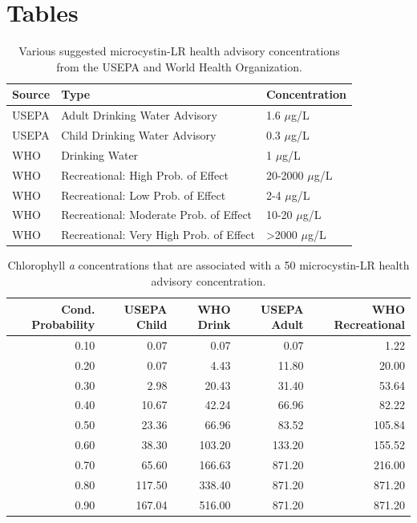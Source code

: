\documentclass[10pt,a4paper,twocolumn]{article}
\begin{document}
\onecolumn

\section{Tables}\label{tables}

\begin{table}[ht]
\caption{Various suggested microcystin-LR health advisory 
                     concentrations from the USEPA and World Health Organization.} 
\label{tab:microcystin_levels}
\begin{tabular}{lll}
  \hline
Source & Type & Concentration \\ 
  \hline
USEPA & Adult Drinking Water Advisory & 1.6 $\mu$g/L \\ 
  USEPA & Child Drinking Water Advisory & 0.3 $\mu$g/L \\ 
  WHO & Drinking Water & 1 $\mu$g/L \\ 
  WHO & Recreational: High Prob. of Effect & 20-2000 $\mu$g/L \\ 
  WHO & Recreational: Low Prob. of Effect & 2-4 $\mu$g/L \\ 
  WHO & Recreational: Moderate Prob. of Effect & 10-20 $\mu$g/L \\ 
  WHO & Recreational: Very High Prob. of Effect & >2000 $\mu$g/L \\ 
   \hline
\end{tabular}
\end{table}

\begin{table}[ht]
\caption{Chlorophyll \textit{a} concentrations that are 
                     associated with a 50%
                     microcystin-LR health advisory concentration.} 
\label{tab:mc_chla_table}
\begin{tabular}{rrrrr}
  \hline
Cond. Probability & USEPA Child & WHO Drink & USEPA Adult & WHO Recreational \\ 
  \hline
0.10 & 0.07 & 0.07 & 0.07 & 1.22 \\ 
  0.20 & 0.07 & 4.43 & 11.80 & 20.00 \\ 
  0.30 & 2.98 & 20.43 & 31.40 & 53.64 \\ 
  0.40 & 10.67 & 42.24 & 66.96 & 82.22 \\ 
  0.50 & 23.36 & 66.96 & 83.52 & 105.84 \\ 
  0.60 & 38.30 & 103.20 & 133.20 & 155.52 \\ 
  0.70 & 65.60 & 166.63 & 871.20 & 216.00 \\ 
  0.80 & 117.50 & 338.40 & 871.20 & 871.20 \\ 
  0.90 & 167.04 & 516.00 & 871.20 & 871.20 \\ 
   \hline
\end{tabular}
\end{table}
\end{document}
